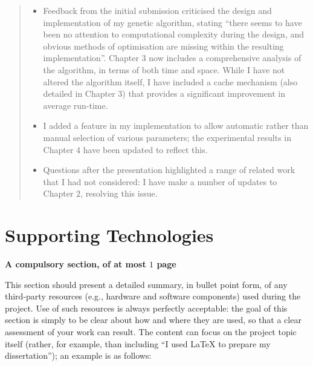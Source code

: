 \documentclass{dissertation}
\begin{document}
\begin{quote}
\noindent
\begin{itemize}
\item Feedback from the initial submission criticised the design and 
      implementation of my genetic algorithm, stating ``there seems 
      to have been no attention to computational complexity during the
      design, and obvious methods of optimisation are missing within
      the resulting implementation''.  Chapter 3 now includes a
      comprehensive analysis of the algorithm, in terms of both time
      and space.  While I have not altered the algorithm itself, I
      have included a cache mechanism (also detailed in Chapter 3)
      that provides a significant improvement in average run-time.
\item I added a feature in my implementation to allow automatic rather
      than manual selection of various parameters; the experimental
      results in Chapter 4 have been updated to reflect this.
\item Questions after the presentation highlighted a range of related
      work that I had not considered: I have make a number of updates 
      to Chapter 2, resolving this issue.
\end{itemize}
\end{quote}


\chapter*{Supporting Technologies}

{\bf A compulsory section, of at most $1$ page}
\vspace{1cm} 

\noindent
This section should present a detailed summary, in bullet point form, 
of any third-party resources (e.g., hardware and software components) 
used during the project.  Use of such resources is always perfectly 
acceptable: the goal of this section is simply to be clear about how
and where they are used, so that a clear assessment of your work can
result.  The content can focus on the project topic itself (rather,
for example, than including ``I used \mbox{\LaTeX} to prepare my 
dissertation''); an example is as follows:
\end{document}
